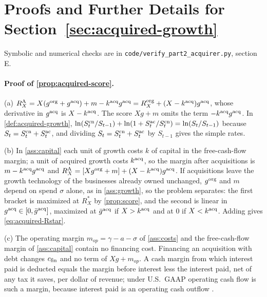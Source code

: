 \section{Proofs and Further Details for Section~\ref{sec:acquired-growth}}\label{app:proofs-acquired}

Symbolic and numerical checks are in \texttt{code/verify\_part2\_acquirer.py}, section E.

\paragraph{Proof of \autoref{prop:acquired-score}.}
(a) $R^{\rm A}_X=X(g^{\rm org}+g^{\rm acq})+m-k^{\rm acq}g^{\rm acq}=R^{\rm org}_X+(X-k^{\rm acq})g^{\rm acq}$, whose derivative in $g^{\rm acq}$ is $X-k^{\rm acq}$. The score $Xg+m$ omits the term $-k^{\rm acq}g^{\rm acq}$. In \autoref{def:acquired-growth}, $\ln(S^{\rm cn}_t/S_{t-1})+\ln(1+S^{\rm ac}_t/S^{\rm cn}_t)=\ln(S_t/S_{t-1})$ because $S_t=S^{\rm cn}_t+S^{\rm ac}_t$, and dividing $S_t=S^{\rm cn}_t+S^{\rm ac}_t$ by $S_{t-1}$ gives the simple rates.

(b) In \autoref{ass:capital} each unit of growth costs $k$ of capital in the free-cash-flow margin; a unit of acquired growth costs $k^{\rm acq}$, so the margin after acquisitions is $m-k^{\rm acq}g^{\rm acq}$ and $R^{\rm A}_X=[Xg^{\rm org}+m]+(X-k^{\rm acq})g^{\rm acq}$. If acquisitions leave the growth technology of the businesses already owned unchanged, $g^{\rm org}$ and $m$ depend on spend $\sigma$ alone, as in \autoref{ass:growth}, so the problem separates: the first bracket is maximized at $R^*_X$ by \autoref{prop:score}, and the second is linear in $g^{\rm acq}\in[0,\bar g^{\rm acq}]$, maximized at $\bar g^{\rm acq}$ if $X>k^{\rm acq}$ and at 0 if $X<k^{\rm acq}$. Adding gives \eqref{eq:acquired-Rstar}.

(c) The operating margin $m_{op}=\gamma-a-\sigma$ of \autoref{ass:costs} and the free-cash-flow margin of \autoref{ass:capital} contain no financing cost. Financing an acquisition with debt changes $c_{\rm fin}$ and no term of $Xg+m_{op}$. A cash margin from which interest paid is deducted equals the margin before interest less the interest paid, net of any tax it saves, per dollar of revenue; under U.S.\ GAAP operating cash flow is such a margin, because interest paid is an operating cash outflow \citep{deloitte2026cashflow}.

